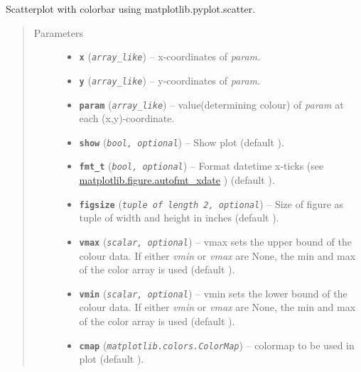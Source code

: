 \documentclass[letterpaper,10pt,english]{sphinxhowto}
\begin{document}
\begin{fulllineitems}
\label{swtools_doc:swtools.plot_scatter}
Scatterplot with colorbar using matplotlib.pyplot.scatter.
\begin{quote}\begin{description}
\item[{Parameters}] \leavevmode\begin{itemize}
\item {} 
\textbf{\texttt{x}} (\emph{\texttt{array\_like}}) -- x-coordinates of \emph{param}.

\item {} 
\textbf{\texttt{y}} (\emph{\texttt{array\_like}}) -- y-coordinates of \emph{param}.

\item {} 
\textbf{\texttt{param}} (\emph{\texttt{array\_like}}) -- value(determining colour) of \emph{param} at each (x,y)-coordinate.

\item {} 
\textbf{\texttt{show}} (\emph{\texttt{bool, optional}}) -- Show plot (default ).

\item {} 
\textbf{\texttt{fmt\_t}} (\emph{\texttt{bool, optional}}) -- Format datetime x-ticks
(see \href{http://matplotlib.org/api/figure\_api.html?highlight=autofmt\_xdate}{matplotlib.figure.autofmt\_xdate} ) (default ).

\item {} 
\textbf{\texttt{figsize}} (\emph{\texttt{tuple of length 2, optional}}) -- Size of figure as tuple of width and height in inches
(default ).

\item {} 
\textbf{\texttt{vmax}} (\emph{\texttt{scalar, optional}}) -- vmax sets the upper bound of the colour data. If either \emph{vmin} or
\emph{vmax} are None, the min and max of the color array is used
(default ).

\item {} 
\textbf{\texttt{vmin}} (\emph{\texttt{scalar, optional}}) -- vmin sets the lower bound of the colour data. If either \emph{vmin} or
\emph{vmax} are None, the min and max of the color array is used
(default ).

\item {} 
\textbf{\texttt{cmap}} (\emph{\texttt{matplotlib.colors.ColorMap}}) -- colormap to be used in plot
(default ).


\end{itemize}
\end{description}
\end{quote}
\end{fulllineitems}
\end{document}
